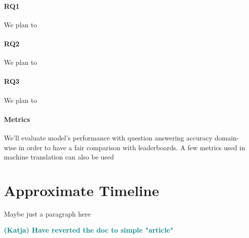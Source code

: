 \documentclass[10pt]{article}
\newcommand{\katja}[1]{\textbf{\textcolor{teal}{(Katja) #1}}}
\begin{document}
\paragraph{RQ1} 
We plan to 

\paragraph{RQ2}
We plan to

\paragraph{RQ3}
We plan to

\paragraph{Metrics}
We'll evaluate model's performance with question answering accuracy domain-wise in order to have a fair comparison with leaderboards. A few metrics used in machine translation can also be used 

\section{Approximate Timeline}
Maybe just a paragraph here


\katja{Have reverted the doc to simple "article"}



\end{document}
